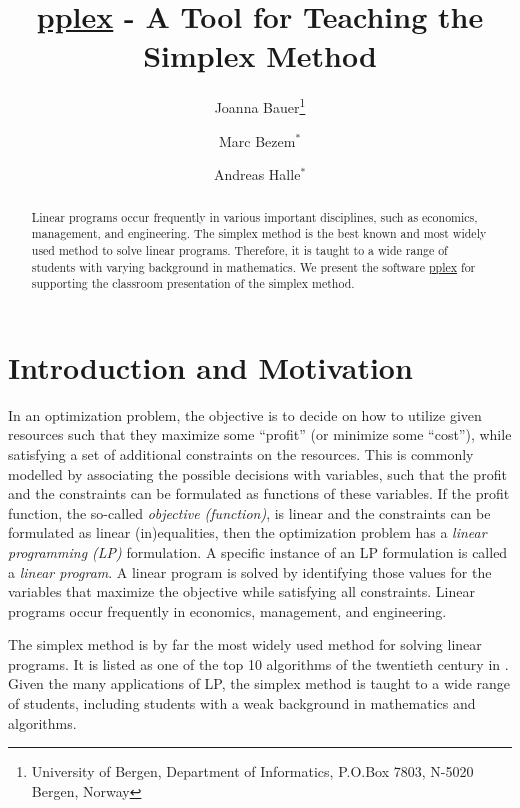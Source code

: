 \documentclass[ukenglish]{nik}
\begin{document}
\title{\url{pplex} - A Tool for Teaching the Simplex Method}

\author{
Joanna Bauer\thanks{University of Bergen, Department of Informatics, P.O.Box 7803, N-5020 Bergen, Norway}
\and
Marc Bezem$^*$
\and
Andreas Halle$^*$}

\maketitle

\begin{abstract}
Linear programs occur frequently in various important disciplines, such as economics, management, and engineering.
The simplex method is the best known and most widely used method to solve linear programs.
Therefore, it is taught to a wide range of students with varying background in mathematics.
We present the software \url{pplex} for supporting
the classroom presentation of the simplex method.
\end{abstract}

\section{Introduction and Motivation}\label{sec:intro}
In an optimization problem, the objective is to decide on how to utilize given resources such that they maximize some ``profit'' (or minimize some ``cost''), while satisfying a set of additional constraints on the resources.
This is commonly modelled by associating the possible decisions with variables, such that the profit and the constraints can be formulated as functions of these variables. 
If the profit function, the so-called \emph{objective (function)}, is linear and the constraints can be formulated as linear (in)equalities, then the optimization problem has a \emph{linear programming (LP)} formulation. A specific instance of an LP formulation is called a \emph{linear program}.
A linear program is solved by identifying those values for the variables that maximize the objective while satisfying all constraints.
Linear programs occur frequently in economics, management, and engineering.

The simplex method is by far the most widely used method for solving linear programs. 
It is listed as one of the top 10 algorithms of the twentieth century in
\cite{CiSaE2000}. Given the many applications of LP, the simplex method is taught to a wide range of
students, including students with a weak background in mathematics and algorithms. 
\end{document}
